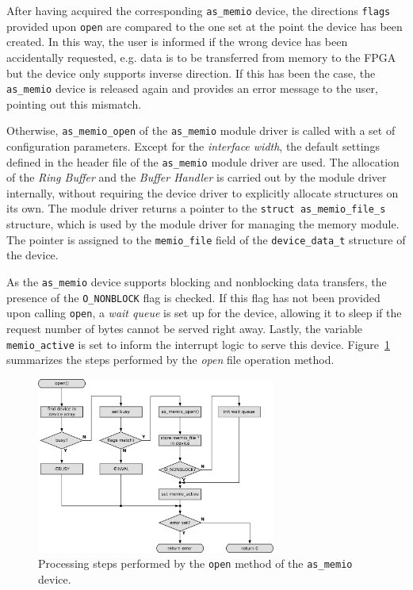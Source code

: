 After having acquired the corresponding \texttt{as\_memio} device, the directions \texttt{flags} provided upon \texttt{open} are compared to the one set at the point the device has been created.
In this way, the user is informed if the wrong device has been accidentally requested, e.g. data is to be transferred from memory to the FPGA but the device only supports inverse direction.
If this has been the case, the \texttt{as\_memio} device is released again and provides an error message to the user, pointing out this mismatch.

Otherwise, \texttt{as\_memio\_open} of the \texttt{as\_memio} module driver is called with a set of configuration parameters.
Except for the \textit{interface width}, the default settings defined in the header file of the \texttt{as\_memio} module driver are used.
The allocation of the \textit{Ring Buffer} and the \textit{Buffer Handler} is carried out by the module driver internally, without requiring the device driver to explicitly allocate structures on its own.
The module driver returns a pointer to the \texttt{struct as\_memio\_file\_s} structure, which is used by the module driver for managing the memory module.
The pointer is assigned to the \texttt{memio\_file} field of the \texttt{device\_data\_t} structure of the device.

As the \texttt{as\_memio} device supports blocking and nonblocking data transfers, the presence of the \texttt{O\_NONBLOCK} flag is checked.
If this flag has not been provided upon calling \texttt{open}, a \textit{wait queue} is set up for the device, allowing it to sleep if the request number of bytes cannot be served right away.
Lastly, the variable \texttt{memio\_active} is set to inform the interrupt logic to serve this device.
Figure~\ref{fig:memio-open} summarizes the steps performed by the \textit{open} file operation method.

\begin{figure}[ht]
    \centering
    \includegraphics[width=0.7\textwidth,height=0.7\textheight,keepaspectratio]{figs/memio_open.png}
    \caption{Processing steps performed by the \texttt{open} method of the \texttt{as\_memio} device.}
    \label{fig:memio-open}
\end{figure}

